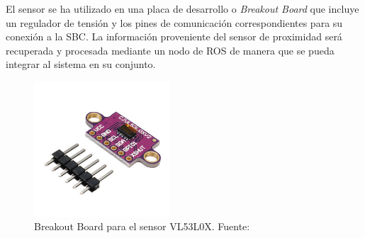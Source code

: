         \begin{table}[!h]
            \centering
            \caption[Características del sensor VL53L0X.]{Características del sensor VL53L0X. Fuente: \cite{vl53l0x}}
            \label{tbl:laserspecs}
            \end{table}
        
            
        El sensor se ha utilizado en una placa de desarrollo o \textit{Breakout Board} que incluye un regulador de tensión 
        y los pines de comunicación correspondientes para su conexión a la SBC. La información proveniente del sensor 
        de proximidad será recuperada y procesada mediante un nodo de ROS de manera que se pueda integrar al sistema 
        en su conjunto.
            
            \begin{figure}[] 
                \centering
                \includegraphics[width=0.45\textwidth]{img/laserbreak}
                \caption[Breakout Board para el sensor VL53L0X]{Breakout Board para el sensor VL53L0X. Fuente: \cite{laser} }
                \label{fig:laserboard}
            \end{figure}
    
